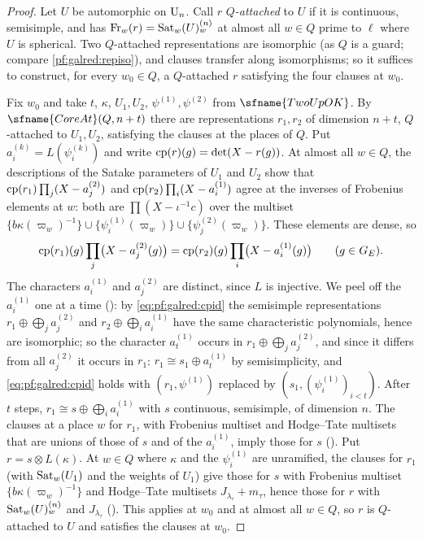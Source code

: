 \begin{proof}
Let $U$ be automorphic on $\mathrm{U}_n$. Call $r$ \emph{$Q$-attached} to $U$ if it is continuous, semisimple, and has
$\operatorname{Fr}_w(r)=\operatorname{Sat}_w(U)^{(n)}_w$ at almost all $w\in Q$ prime to $\ell$ where $U$ is spherical. Two $Q$-attached
representations are isomorphic (as $Q$ is a guard; compare \cref{pf:galred:repiso}), and clauses transfer along
isomorphisms; so it suffices to construct, for every $w_0\in Q$, a $Q$-attached $r$ satisfying the four clauses at $w_0$.

Fix $w_0$ and take $t$, $\kappa$, $U_1,U_2$, $\psi^{(1)},\psi^{(2)}$ from $\sfname{TwoUpOK}$. By $\sfname{CoreAt}(Q,n+t)$ there
are representations $r_1,r_2$ of dimension $n+t$, $Q$-attached to $U_1,U_2$, satisfying the clauses at the places of $Q$. Put
$a^{(k)}_i=L(\psi^{(k)}_i)$ and write $\operatorname{cp}(r)(g)=\det(X-r(g))$. At almost all $w\in Q$, the descriptions of the Satake
parameters of $U_1$ and $U_2$ show that $\operatorname{cp}(r_1)\prod_j(X-a^{(2)}_j)$ and $\operatorname{cp}(r_2)\prod_i(X-a^{(1)}_i)$ agree at
the inverses of Frobenius elements at $w$: both are $\prod(X-\iota^{-1}c)$ over the multiset
$\{b\kappa(\varpi_w)^{-1}\}\cup\{\psi^{(1)}_i(\varpi_w)\}\cup\{\psi^{(2)}_j(\varpi_w)\}$. These elements are dense, so
\begin{equation}\label{eq:pf:galred:cpid}
  \operatorname{cp}(r_1)(g)\prod_j\bigl(X-a^{(2)}_j(g)\bigr)=\operatorname{cp}(r_2)(g)\prod_i\bigl(X-a^{(1)}_i(g)\bigr)\qquad(g\in G_E).
\end{equation}
The characters $a^{(1)}_i$ and $a^{(2)}_j$ are distinct, since $L$ is injective. We peel off the $a^{(1)}_i$ one at a time
(): by \eqref{eq:pf:galred:cpid} the semisimple representations $r_1\oplus
\bigoplus_ja^{(2)}_j$ and $r_2\oplus\bigoplus_ia^{(1)}_i$ have the same characteristic polynomials, hence are isomorphic; so the
character $a^{(1)}_t$ occurs in $r_1\oplus\bigoplus_ja^{(2)}_j$, and since it differs from all $a^{(2)}_j$ it occurs in $r_1$:
$r_1\cong s_1\oplus a^{(1)}_t$ by semisimplicity, and \eqref{eq:pf:galred:cpid} holds with $(r_1,\psi^{(1)})$ replaced by
$(s_1,(\psi^{(1)}_i)_{i<t})$. After $t$ steps, $r_1\cong s\oplus\bigoplus_ia^{(1)}_i$ with $s$ continuous, semisimple, of
dimension $n$. The clauses at a place $w$ for $r_1$, with Frobenius multiset and Hodge--Tate multisets that are unions of
those of $s$ and of the $a^{(1)}_i$, imply those for $s$ (). Put $r=s\otimes L(\kappa)$.
At $w\in Q$ where $\kappa$ and the $\psi^{(1)}_i$ are unramified, the clauses for $r_1$ (with $\operatorname{Sat}_w(U_1)$ and the
weights of $U_1$) give those for $s$ with Frobenius multiset $\{b\kappa(\varpi_w)^{-1}\}$ and Hodge--Tate multisets
$J_{\lambda_\tau}+m_\tau$, hence those for $r$ with $\operatorname{Sat}_w(U)^{(n)}_w$ and $J_{\lambda_\tau}$
(). This applies at $w_0$ and at almost all $w\in Q$, so $r$ is $Q$-attached to $U$ and
satisfies the clauses at $w_0$.
\end{proof}

